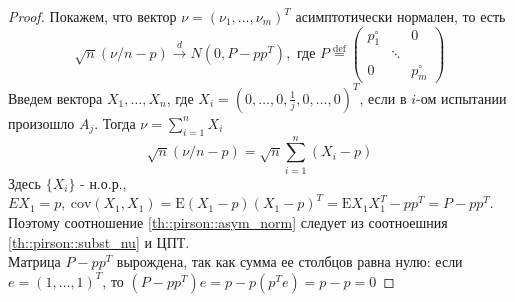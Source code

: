 \documentclass[12pt]{article}
\theoremstyle{basic_theorem}
\theoremstyle{name_theorem}
\newcommand*{\defeq}{\stackrel{\text{def}}{=}}
\def\cov{ \mathrm{cov} }
\def\E{ \mathrm{E} }
\begin{document}
    \begin{proof}
        Покажем, что вектор $\nu=(\nu_1,\ldots,\nu_m)^T$ асимптотически нормален, то есть
        \begin{equation}\label{th::pirson::asym_norm}
            \sqrt{n}(\nu/n-p)\xrightarrow{d}N(0,P-pp^T),\text{ где }P\defeq\begin{pmatrix}
                p_1^\circ & & 0 \\
                  & \ddots & \\
                0 & & p_m^\circ
            \end{pmatrix}
        \end{equation}
        Введем вектора $X_1,\ldots,X_n$, где $X_i=(0,\ldots,0,\frac{1}{j},0,\ldots,0)^T$,
        если в $i$-ом испытании произошло $A_j$. Тогда $\nu=\sum_{i=1}^nX_i$
        \begin{equation}\label{th::pirson::subst_nu}
            \sqrt{n}(\nu/n-p)=\sqrt{n}\sum_{i=1}^n(X_i-p)
        \end{equation}
        Здесь $\{X_i\}$ - н.о.р., $EX_1=p,\ \cov(X_1,X_1)=\E(X_1-p)(X_1-p)^T=\E X_1X_1^T-pp^T=P-pp^T$.
        Поэтому соотношение \eqref{th::pirson::asym_norm} следует из соотноешния \eqref{th::pirson::subst_nu}
        и ЦПТ. \\
        Матрица $P-pp^T$ вырождена, так как сумма ее столбцов равна нулю:
        если $e=(1,\ldots,1)^T$, то $(P-pp^T)e=p-p(p^Te)=p-p=0$


\end{proof}
\end{document}
